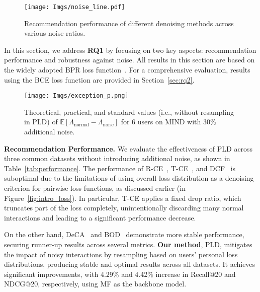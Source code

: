 

\begin{figure*}[t]
    \centering
    \texttt{[image: Imgs/noise\_line.pdf]}
    \caption{Recommendation performance of different denoising methods across various noise ratios.}
    \label{fig:noise_mind}
\end{figure*}

In this section, we address \textbf{RQ1} by focusing on two key aspects: recommendation performance and robustness against noise. All results in this section are based on the widely adopted BPR loss function~\cite{rendle2009bpr}. For a comprehensive evaluation, results using the BCE loss function are provided in Section~\ref{sec:rq2}.



\begin{figure}
    \centering
    \texttt{[image: Imgs/exception\_p.png]}
    \caption{Theoretical, practical, and standard values (i.e., without resampling in PLD) of $\mathbb{E}[\Lambda_{\text{normal}} - \Lambda_{\text{noise}}]$ for 6 users on MIND with 30\% additional noise.}
    \label{fig:exception}
\end{figure}

\textbf{Recommendation Performance.}
We evaluate the effectiveness of PLD across three common datasets without introducing additional noise, as shown in Table~\ref{tab:performance}. The performance of R-CE~\cite{wang2021denoising}, T-CE~\cite{wang2021denoising}, and DCF~\cite{he2024double} is suboptimal due to the limitations of using overall loss distribution as a denoising criterion for pairwise loss functions, as discussed earlier (in Figure~\ref{fig:intro_loss}). In particular, T-CE applies a fixed drop ratio, which truncates part of the loss completely, unintentionally discarding many normal interactions and leading to a significant performance decrease.

On the other hand, DeCA~\cite{wang2022learning} and BOD~\cite{wang2023efficient} demonstrate more stable performance, securing runner-up results across several metrics. \textbf{Our method}, PLD, mitigates the impact of noisy interactions by resampling based on users' personal loss distributions, producing stable and optimal results across all datasets. It achieves significant improvements, with 4.29\% and 4.42\% increase in Recall@20 and NDCG@20, respectively, using MF as the backbone model.

